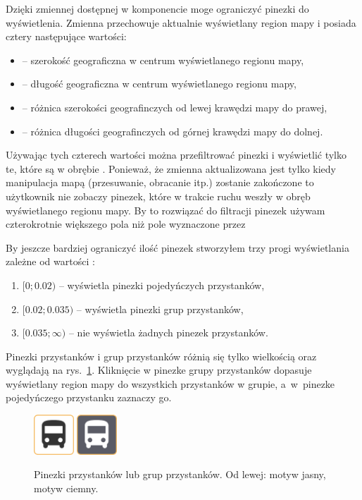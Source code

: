 \documentclass{SGGW-thesis}
\begin{document}
Dzięki zmiennej  dostępnej w komponencie  moge ograniczyć pinezki do wyświetlenia.
Zmienna  przechowuje aktualnie wyświetlany region mapy i posiada cztery następujące wartości:
\begin{itemize}
  \item{ -- szerokość geograficzna w centrum wyświetlanego regionu mapy,}
  \item{ -- długość geograficzna w centrum wyświetlanego regionu mapy,}
  \item{ -- różnica szerokości geografinczych od lewej krawędzi mapy do prawej,}
  \item{ -- różnica długości geografinczych od górnej krawędzi mapy do dolnej.}
\end{itemize}
Używając tych czterech wartości można przefiltrować pinezki i wyświetlić tylko te, które są w obrębie .
Ponieważ, że zmienna  aktualizowana jest tylko kiedy manipulacja mapą (przesuwanie, obracanie itp.) zostanie zakończone to użytkownik nie zobaczy pinezek,
które w trakcie ruchu weszły w obręb wyświetlanego regionu mapy.
By to rozwiązać do filtracji pinezek używam czterokrotnie większego pola niż pole wyznaczone przez 

By jeszcze bardziej ograniczyć ilość pinezek stworzyłem trzy progi wyświetlania zależne od wartości :
\begin{enumerate}
  \item{$[0;0.02)$ -- wyświetla pinezki pojedyńczych przystanków,}
  \item{$[0.02; 0.035)$ -- wyświetla pinezki grup przystanków,}
  \item{$[0.035;\infty)$ -- nie wyświetla żadnych pinezek przystanków.}
\end{enumerate}


Pinezki przystanków i grup przystanków różnią się tylko wielkością oraz wyglądają na rys.~\ref{screen.pin_przystanki}.
Kliknięcie w pinezke grupy przystanków dopasuje wyświetlany region mapy do wszystkich przystanków w grupie,
a~w~pinezke pojedyńczego przystanku zaznaczy go.
\begin{figure}
  \centering
  \includegraphics[width=15mm]{screeny/busstop_jasny}
  \enspace\enspace
  \includegraphics[width=15mm]{screeny/busstop_ciemny}
  \caption[Pinezki przystanków]{
    \label{screen.pin_przystanki}
    Pinezki przystanków lub grup przystanków. Od lewej: motyw jasny, motyw ciemny. \vspace{2ex}
  }
\end{figure}
\end{document}
